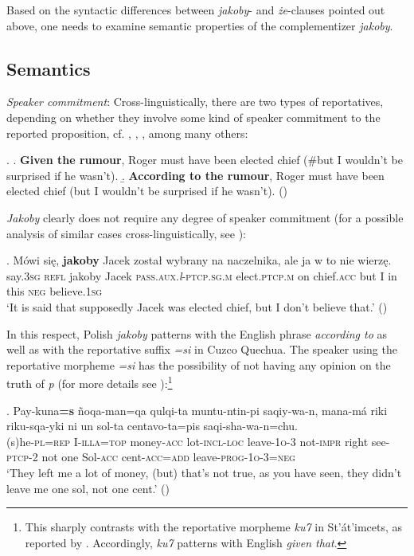 \documentclass[output=paper
,modfonts
,nonflat]{langsci/langscibook}
\newcommand{\glossformat}[1]{\textsc{#1}}
\newcommand{\firstperson}{\glossformat{1}\xspace}
\newcommand{\secondperson}{\glossformat{2}\xspace}
\newcommand{\thirdperson}{\glossformat{3}\xspace}
\newcommand{\acc}{\glossformat{acc}\xspace}
\newcommand{\add}{\glossformat{add}\xspace}
\newcommand{\illa}{\glossformat{illa}\xspace}
\newcommand{\impr}{\glossformat{impr}\xspace}
\newcommand{\incl}{\glossformat{incl}\xspace}
\newcommand{\loc}{\glossformat{loc}\xspace}
\newcommand{\negation}{\glossformat{neg}\xspace}
\newcommand{\lptcp}{\emph{l}\glossformat{-ptcp}\xspace}
\newcommand{\masc}{\glossformat{m}\xspace}
\newcommand{\object}{\glossformat{o}\xspace}
\newcommand{\passaux}{\glossformat{pass.aux}\xspace}
\newcommand{\ptcp}{\glossformat{ptcp}\xspace}
\newcommand{\pl}{\glossformat{pl}\xspace}
\newcommand{\prog}{\glossformat{prog}\xspace}
\newcommand{\refl}{\glossformat{refl}\xspace}
\newcommand{\rep}{\glossformat{rep}\xspace}
\newcommand{\sg}{\glossformat{sg}\xspace}
\newcommand{\topi}{\glossformat{top}\xspace}
\newcommand{\nquelle}[1]{\newline\phantom{x}\hfill(#1)}
\begin{document}
Based on the syntactic differences between \emph{jakoby}- and \emph{że}-clauses pointed out above, one needs to examine semantic properties of the complementizer \emph{jakoby}.

\subsection{Semantics}

\emph{Speaker commitment}: Cross-linguistically, there are two types of reportatives, depending on whether they involve some kind of speaker commitment to the reported proposition, cf. \textcite{Faller2011}, \textcite{Kratzer2012}, \textcite{Murray2017}, among many others:

\ex.	\a.	\textbf{Given the rumour}, Roger must have been elected chief (\#but I wouldn't be surprised if he wasn't).
	\b.	\textbf{According to the rumour}, Roger must have been elected chief (but I wouldn't be surprised if he wasn't). \nquelle{\citealt[679]{Faller2011}}

\noindent \emph{Jakoby} clearly does not require any degree of speaker commitment (for a possible analysis of similar cases cross-linguistically, see \textcite{AnderBois2014}):

\exg.		Mówi się, \textbf{jakoby} Jacek został wybrany na naczelnika, ale ja w to nie wierzę. \\
		say.{\thirdperson}{\sg} {\refl} jakoby Jacek  {\passaux}.{\lptcp}.{\sg}.{\masc} elect.{\ptcp}.{\masc} on chief.{\acc} but I in this {\negation} believe.{\firstperson}{\sg} \\
		`It is said that supposedly Jacek was elected chief, but I don't believe that.' \nquelle{\citealt[14]{JedrzejowskiSchenner-2013}}

In this respect, Polish \emph{jakoby} patterns with the English phrase \emph{according to} as well as with the reportative suffix \emph{=si} in Cuzco Quechua. The speaker using the reportative morpheme \emph{=si} has the possibility of not having any opinion on the truth of \emph{p} (for more details see \textcite{Faller2011}):\footnote{
This sharply contrasts with the reportative morpheme \emph{ku7} in St'át'imcets, as reported by \textcite{Lisa-Matthewson-Davis2017}. Accordingly, \emph{ku7} patterns with English \emph{given that}.  
}

\exg.		Pay-kuna\textbf{=s} ñoqa-man=qa qulqi-ta muntu-ntin-pi saqiy-wa-n, mana-má riki riku-sqa-yki ni un sol-ta centavo-ta=pis saqi-sha-wa-n=chu. \\
		(s)he-{\pl}={\rep} I-{\illa}={\topi} money-{\acc} lot-{\incl}-{\loc} leave-{\firstperson}{\object}-{\thirdperson} not-{\impr} right see-{\ptcp}-{\secondperson} not one Sol-{\acc} cent-{\acc}={\add} leave-{\prog}-{\firstperson}{\object}-{\thirdperson}={\negation} \\
		 `They left me a lot of money, (but) that's not true, as you have seen, they didn't leave me one sol, not one cent.' \nquelle{\citealt[679, ex. 37]{Faller2011}}
\end{document}
